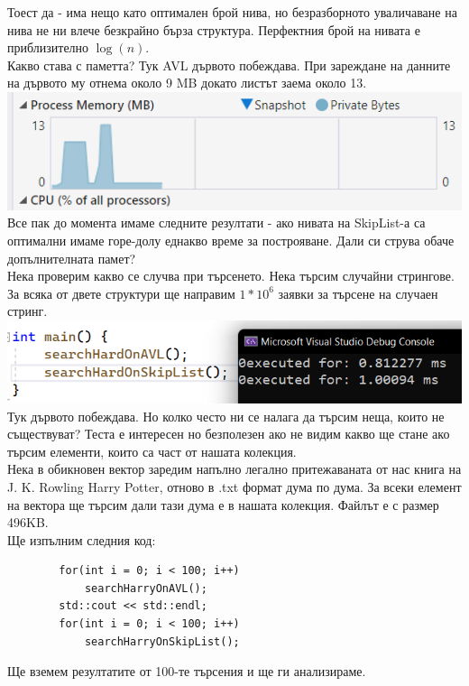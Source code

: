 \documentclass[a4paper,12pt,fleqn]{article}
\begin{document}
	Тоест да - има нещо като оптимален брой нива, но безразборното уваличаване на нива не ни влече безкрайно бърза структура. Перфектния брой на нивата е приблизително $\log(n)$.\\
	Какво става с паметта? Тук AVL дървото побеждава. При зареждане на данните на дървото му отнема около 9 MB докато листът заема около 13.\\
	\includegraphics[scale=0.4]{mem-consume.png}\\
	Все пак до момента имаме следните резултати - ако нивата на SkipList-а са оптимални имаме горе-долу еднакво време за построяване. Дали си струва обаче допълнителната памет?\\
	Нека проверим какво се случва при търсенето. Нека търсим случайни стрингове. За всяка от двете структури ще направим $1*10^6$ заявки за търсене на случаен стринг.\\
	\includegraphics[scale=0.4]{search.png}\\
	Тук дървото побеждава. Но колко често ни се налага да търсим неща, които не съществуват? Теста е интересен но безполезен ако не видим какво ще стане ако търсим елементи, които са част от нашата колекция.\\
	Нека в обикновен вектор заредим напълно легално притежаваната от нас книга на J. K. Rowling Harry Potter, отново в .txt формат дума по дума. За всеки елемент на вектора ще търсим дали тази дума е в нашата колекция. Файлът е с размер 496KB.\\
	Ще изпълним следния код:\\
	\begin{lstlisting}
		for(int i = 0; i < 100; i++)
			searchHarryOnAVL();
		std::cout << std::endl;
		for(int i = 0; i < 100; i++)
			searchHarryOnSkipList();
	\end{lstlisting}
	Ще вземем резултатите от 100-те търсения и ще ги анализираме.\\
\end{document}
